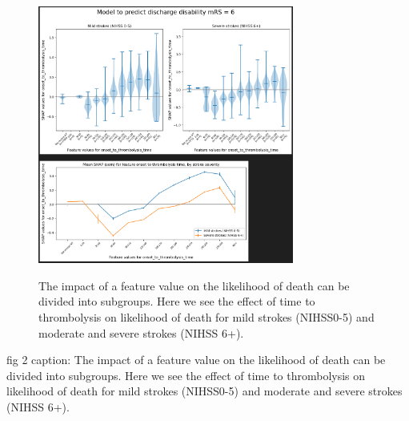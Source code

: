 \begin{figure}[!h]
    \centering    
    \includegraphics[width=0.75\textwidth]
{./images/053_predict_mrs6_split_by_ss.png}\\
    \caption{The impact of a feature value on the likelihood of death can be divided into subgroups. Here we see the effect of time to thrombolysis on likelihood of death for mild strokes (NIHSS0-5) and moderate and severe strokes (NIHSS 6+).}
    \label{fig:mrs6_violin_split}
\end{figure}




fig 2 caption: The impact of a feature value on the likelihood of death can be divided into subgroups. Here we see the effect of time to thrombolysis on likelihood of death for mild strokes (NIHSS0-5) and moderate and severe strokes (NIHSS 6+).


